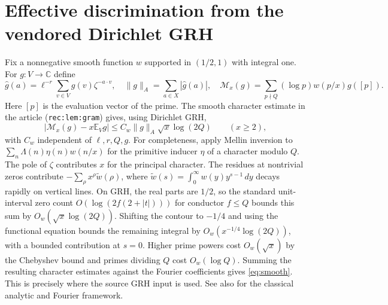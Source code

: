 \documentclass[11pt]{article}
\theoremstyle{remark}\newtheorem{remark}[theorem]{Remark}
\newcommand{\C}{\mathbb C}
\newcommand{\E}{\mathbb E}
\newcommand{\norm}[1]{\lVert#1\rVert}
\begin{document}
\section{Effective discrimination from the vendored Dirichlet GRH}
Fix a nonnegative smooth function $w$ supported in $(1/2,1)$ with integral one. For $g:V\to\C$ define
\[
 \widehat g(a)=\ell^{-r}\sum_{v\in V}g(v)\zeta^{-a\cdot v},\quad
 \norm{g}_A=\sum_{a\in X}|\widehat g(a)|,\quad
 \mathcal M_x(g)=\sum_{p\nmid Q}(\log p)w(p/x)g([p]).
\]
Here $[p]$ is the evaluation vector of the prime. The smooth character estimate in the article (\texttt{rec:lem:gram}) gives, using Dirichlet GRH,
\begin{equation}\label{eq:smooth}
 \big|\mathcal M_x(g)-x\E_Vg\big|\le C_w\norm{g}_A\sqrt x\log(2Q)\qquad(x\ge 2),
\end{equation}
with $C_w$ independent of $\ell,r,Q,g$. For completeness, apply Mellin inversion to $\sum_n\Lambda(n)\eta(n)w(n/x)$ for the primitive inducer $\eta$ of a character modulo $Q$. The pole of $\zeta$ contributes $x$ for the principal character. The residues at nontrivial zeros contribute $-\sum_\rho x^\rho\widetilde w(\rho)$, where $\widetilde w(s)=\int_0^\infty w(y)y^{s-1}\,dy$ decays rapidly on vertical lines. On GRH, the real parts are $1/2$, so the standard unit-interval zero count $O(\log(2f(2+|t|)))$ for conductor $f\le Q$ bounds this sum by $O_w(\sqrt x\log(2Q))$. Shifting the contour to $-1/4$ and using the functional equation bounds the remaining integral by $O_w(x^{-1/4}\log(2Q))$, with a bounded contribution at $s=0$. Higher prime powers cost $O_w(\sqrt x)$ by the Chebyshev bound and primes dividing $Q$ cost $O_w(\log Q)$. Summing the resulting character estimates against the Fourier coefficients gives \eqref{eq:smooth}. This is precisely where the source GRH input is used. See also \cite{Davenport,Bellaiche} for the classical analytic and Fourier framework.
\end{document}
